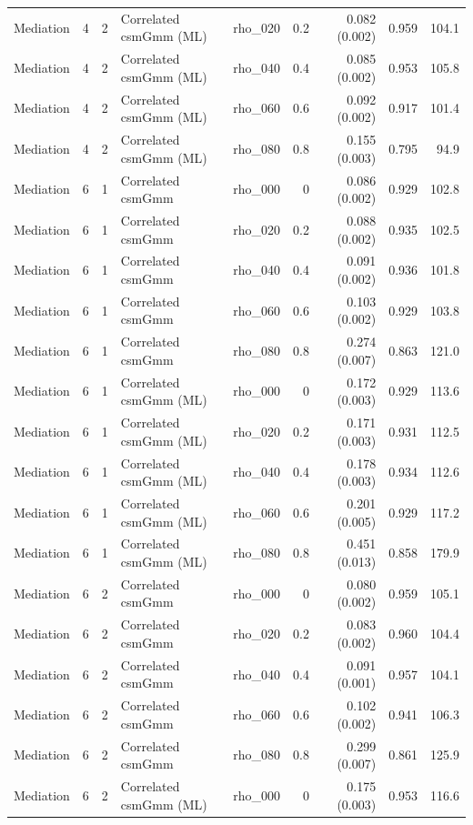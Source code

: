 \begin{longtable}{lcclrrrrr}
Mediation & 4 & 2 & Correlated csmGmm (ML) & rho\_020 & 0.2 & 0.082 (0.002) & 0.959 & 104.1\\
Mediation & 4 & 2 & Correlated csmGmm (ML) & rho\_040 & 0.4 & 0.085 (0.002) & 0.953 & 105.8\\
Mediation & 4 & 2 & Correlated csmGmm (ML) & rho\_060 & 0.6 & 0.092 (0.002) & 0.917 & 101.4\\
Mediation & 4 & 2 & Correlated csmGmm (ML) & rho\_080 & 0.8 & 0.155 (0.003) & 0.795 & 94.9\\
Mediation & 6 & 1 & Correlated csmGmm & rho\_000 & 0 & 0.086 (0.002) & 0.929 & 102.8\\
Mediation & 6 & 1 & Correlated csmGmm & rho\_020 & 0.2 & 0.088 (0.002) & 0.935 & 102.5\\
Mediation & 6 & 1 & Correlated csmGmm & rho\_040 & 0.4 & 0.091 (0.002) & 0.936 & 101.8\\
Mediation & 6 & 1 & Correlated csmGmm & rho\_060 & 0.6 & 0.103 (0.002) & 0.929 & 103.8\\
Mediation & 6 & 1 & Correlated csmGmm & rho\_080 & 0.8 & 0.274 (0.007) & 0.863 & 121.0\\
Mediation & 6 & 1 & Correlated csmGmm (ML) & rho\_000 & 0 & 0.172 (0.003) & 0.929 & 113.6\\
Mediation & 6 & 1 & Correlated csmGmm (ML) & rho\_020 & 0.2 & 0.171 (0.003) & 0.931 & 112.5\\
Mediation & 6 & 1 & Correlated csmGmm (ML) & rho\_040 & 0.4 & 0.178 (0.003) & 0.934 & 112.6\\
Mediation & 6 & 1 & Correlated csmGmm (ML) & rho\_060 & 0.6 & 0.201 (0.005) & 0.929 & 117.2\\
Mediation & 6 & 1 & Correlated csmGmm (ML) & rho\_080 & 0.8 & 0.451 (0.013) & 0.858 & 179.9\\
Mediation & 6 & 2 & Correlated csmGmm & rho\_000 & 0 & 0.080 (0.002) & 0.959 & 105.1\\
Mediation & 6 & 2 & Correlated csmGmm & rho\_020 & 0.2 & 0.083 (0.002) & 0.960 & 104.4\\
Mediation & 6 & 2 & Correlated csmGmm & rho\_040 & 0.4 & 0.091 (0.001) & 0.957 & 104.1\\
Mediation & 6 & 2 & Correlated csmGmm & rho\_060 & 0.6 & 0.102 (0.002) & 0.941 & 106.3\\
Mediation & 6 & 2 & Correlated csmGmm & rho\_080 & 0.8 & 0.299 (0.007) & 0.861 & 125.9\\
Mediation & 6 & 2 & Correlated csmGmm (ML) & rho\_000 & 0 & 0.175 (0.003) & 0.953 & 116.6\\

\end{longtable}
